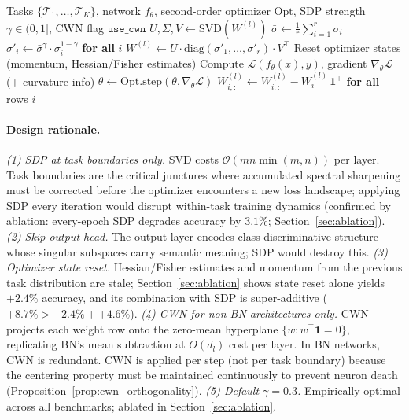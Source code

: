 \documentclass{article}
\newcommand{\diag}{\mathrm{diag}}
\newcommand{\cL}{\mathcal{L}}
\newcommand{\cT}{\mathcal{T}}
\newcommand{\cO}{\mathcal{O}}
\begin{document}
\begin{algorithm}[t]
\caption{Curvature-Aware Continual Learning with SDP + CWN}
\label{alg:casdp}
\begin{algorithmic}[1]
\REQUIRE Tasks $\{\cT_1, \ldots, \cT_K\}$, network $f_\theta$, second-order optimizer $\mathrm{Opt}$, SDP strength $\gamma \in (0,1]$, CWN flag $\texttt{use\_cwn}$
            \STATE $U, \Sigma, V \leftarrow \text{SVD}(W^{(l)})$ 
            \STATE $\bar{\sigma} \leftarrow \frac{1}{r}\sum_{i=1}^r \sigma_i$
            \STATE $\sigma'_i \leftarrow \bar{\sigma}^\gamma \cdot \sigma_i^{1-\gamma}$ \textbf{for all} $i$ 
            \STATE $W^{(l)} \leftarrow U \cdot \diag(\sigma'_1, \ldots, \sigma'_r) \cdot V^\top$
        \ENDFOR
        \STATE Reset optimizer states (momentum, Hessian/Fisher estimates)
    \ENDIF
    \FOR{each epoch in $\cT_k$}
            \STATE Compute $\cL(f_\theta(x), y)$, gradient $\nabla_\theta \cL$ (+ curvature info)
            \STATE $\theta \leftarrow \mathrm{Opt}.\text{step}(\theta, \nabla_\theta \cL)$
                    \STATE $W^{(l)}_{i,:} \leftarrow W^{(l)}_{i,:} - \bar{W}^{(l)}_{i}\,\mathbf{1}^\top$ \textbf{for all} rows $i$ 
                \ENDFOR
            \ENDIF
        \ENDFOR
    \ENDFOR
\ENDFOR
\end{algorithmic}
\end{algorithm}

\paragraph{Design rationale.}
\emph{(1) SDP at task boundaries only.} SVD costs $\cO(mn\min(m,n))$ per layer. Task boundaries are the critical junctures where accumulated spectral sharpening must be corrected before the optimizer encounters a new loss landscape; applying SDP every iteration would disrupt within-task training dynamics (confirmed by ablation: every-epoch SDP degrades accuracy by $3.1\%$; Section~\ref{sec:ablation}).
\emph{(2) Skip output head.} The output layer encodes class-discriminative structure whose singular subspaces carry semantic meaning; SDP would destroy this.
\emph{(3) Optimizer state reset.} Hessian/Fisher estimates and momentum from the previous task distribution are stale; Section~\ref{sec:ablation} shows state reset alone yields $+2.4\%$ accuracy, and its combination with SDP is super-additive ($+8.7\% > +2.4\% + +4.6\%$).
\emph{(4) CWN for non-BN architectures only.} CWN projects each weight row onto the zero-mean hyperplane $\{w : w^\top\mathbf{1} = 0\}$, replicating BN's mean subtraction at $O(d_l)$ cost per layer. In BN networks, CWN is redundant. CWN is applied per step (not per task boundary) because the centering property must be maintained continuously to prevent neuron death (Proposition~\ref{prop:cwn_orthogonality}).
\emph{(5) Default $\gamma = 0.3$.} Empirically optimal across all benchmarks; ablated in Section~\ref{sec:ablation}.
\end{document}
